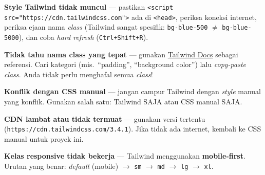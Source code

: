 \begin{peringatan}
\textbf{Style Tailwind tidak muncul} --- pastikan \texttt{<script src="https://cdn.tailwindcss.com">} ada di \texttt{<head>}, periksa koneksi internet, periksa ejaan nama \emph{class} (Tailwind sangat spesifik: \texttt{bg-blue-500} $\neq$ \texttt{bg-blue-5000}), dan coba \emph{hard refresh} (\texttt{Ctrl+Shift+R}).
\end{peringatan}

\begin{tip}
\textbf{Tidak tahu nama class yang tepat} --- gunakan \href{https://tailwindcss.com/docs}{Tailwind Docs} sebagai referensi. Cari kategori (mis.\ ``padding'', ``background color'') lalu \emph{copy-paste} \emph{class}. Anda tidak perlu menghafal semua \emph{class}!
\end{tip}

\begin{catatan}
\textbf{Konflik dengan CSS manual} --- jangan campur Tailwind dengan \emph{style} manual yang konflik. Gunakan salah satu: Tailwind SAJA atau CSS manual SAJA.
\end{catatan}

\begin{catatan}
\textbf{CDN lambat atau tidak termuat} --- gunakan versi tertentu (\texttt{https://cdn.tailwindcss.com/3.4.1}). Jika tidak ada internet, kembali ke CSS manual untuk proyek ini.
\end{catatan}

\begin{catatan}
\textbf{Kelas responsive tidak bekerja} --- Tailwind menggunakan \textbf{mobile-first}. Urutan yang benar: \emph{default} (mobile) $\rightarrow$ \texttt{sm} $\rightarrow$ \texttt{md} $\rightarrow$ \texttt{lg} $\rightarrow$ \texttt{xl}.
\end{catatan}
